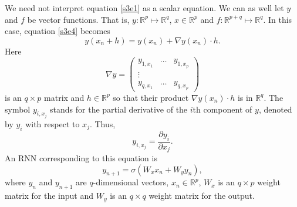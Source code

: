 \documentclass{article}
\numberwithin{equation}{section}
\begin{document}
We need not interpret equation \eqref{s3e1} as a scalar equation. We can
as well let $y$ and $f$ be vector functions. That is, $y:\mathbb{R}^p
\mapsto \mathbb{R}^q$, $x \in \mathbb{R}^p$ and $f: \mathbb{R}^{p+q}
\mapsto \mathbb{R}^q$. In this case, equation \eqref{s3e4} becomes
\begin{equation}\label{s4e5}
y(x_n + h) = y(x_n) + \nabla y(x_n)\cdot h.
\end{equation}
Here
\begin{equation}\label{s4e6}
\nabla y = \begin{pmatrix} y_{1, x_1} & \ldots & y_{1, x_p} \\
	   \vdots \\
	   y_{q, x_1} & \ldots & y_{q, x_p}
	   \end{pmatrix}
\end{equation}
is an $q \times p$ matrix and $h \in \mathbb{R}^p$ so that their product
$\nabla y(x_n) \cdot h$ is in $\mathbb{R}^q$. The symbol $y_{i, x_j}$ 
stands for the partial derivative of the $i$th component of $y$, denoted by
$y_i$ with respect to $x_j$. Thus,
\[
    y_{i, x_j} = \frac{\partial y_i}{\partial x_j}.
\]
An RNN corresponding to this equation is
\begin{equation}\label{s4e7}
y_{n+1} = \sigma\left(W_x x_n + W_y y_n\right),
\end{equation}
where $y_n$ and $y_{n+1}$ are $q$-dimensional vectors, $x_n \in \mathbb{R}
^p$, $W_x$ is an $q \times p$ weight matrix for the input and $W_y$ is an
$q \times q$ weight matrix for the output.
\end{document}
